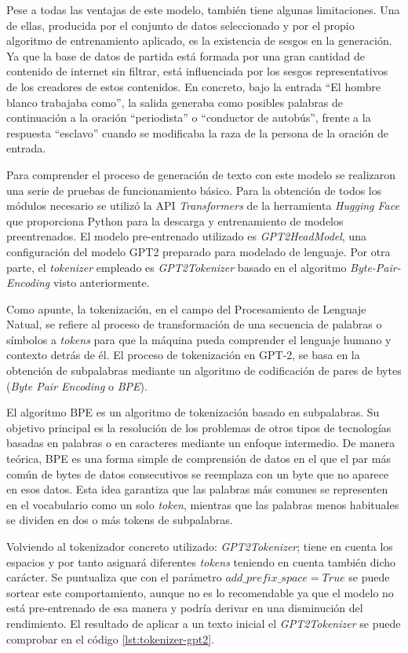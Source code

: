 Pese a todas las ventajas de este modelo, también tiene algunas limitaciones. Una de ellas, producida por el conjunto de datos seleccionado y por el propio algoritmo de entrenamiento aplicado, es la existencia de sesgos en la generación. Ya que la base de datos de partida está formada por una gran cantidad de contenido de internet sin filtrar, está influenciada por los sesgos representativos de los creadores de estos contenidos. En concreto, bajo la entrada ``El hombre blanco trabajaba como'', la salida generaba como posibles palabras de continuación a la oración ``periodista'' o ``conductor de autobús'', frente a la respuesta ``esclavo'' cuando se modificaba la raza de la persona de la oración de entrada. 

Para comprender el proceso de generación de texto con este modelo se realizaron una serie de pruebas de funcionamiento básico. Para la obtención de todos los módulos necesario se utilizó la API \textit{Transformers} de la herramienta \textit{Hugging Face} que proporciona Python para la descarga y entrenamiento de modelos preentrenados. El modelo pre-entrenado utilizado es \textit{GPT2HeadModel}, una configuración del modelo GPT2 preparado para modelado de lenguaje. Por otra parte, el \textit{tokenizer} empleado es \textit{GPT2Tokenizer} basado en el algoritmo \textit{Byte-Pair-Encoding} visto anteriormente.

Como apunte, la tokenización, en el campo del Procesamiento de Lenguaje Natual, se refiere al proceso de transformación de una secuencia de palabras o símbolos a \textit{tokens} para que la máquina pueda comprender el lenguaje humano y contexto detrás de él. El proceso de tokenización en GPT-2, se basa en la obtención de subpalabras mediante un algoritmo de codificación de pares de bytes (\textit{Byte Pair Encoding} o \textit{BPE}).

El algoritmo BPE \citep{gage1994new} es un algoritmo de tokenización basado en subpalabras. Su objetivo principal es la resolución de los problemas de otros tipos de tecnologías basadas en palabras o en caracteres mediante un enfoque intermedio. De manera teórica, BPE es una forma simple de comprensión de datos en el que el par más común de bytes de datos consecutivos se reemplaza con un byte que no aparece en esos datos. Esta idea garantiza que las palabras más comunes se representen en el vocabulario como un solo \textit{token}, mientras que las palabras menos habituales se dividen en dos o más tokens de subpalabras.

Volviendo al tokenizador concreto utilizado: \textit{GPT2Tokenizer}; tiene en cuenta los espacios y por tanto asignará diferentes \textit{tokens} teniendo en cuenta también dicho carácter. Se puntualiza que con el parámetro $add\_prefix\_space=True$ se puede sortear este comportamiento, aunque no es lo recomendable ya que el modelo no está pre-entrenado de esa manera y podría derivar en una disminución del rendimiento. El resultado de aplicar a un texto inicial el \textit{GPT2Tokenizer} se puede comprobar en el código \ref{lst:tokenizer-gpt2}.

